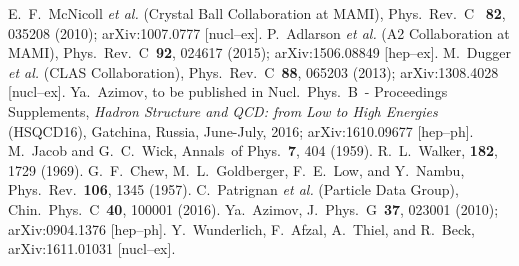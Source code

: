 \documentclass[prc,reprint,onecolumn,amsmath,amssymb,superscriptaddress]{revtex4-1}
\begin{document}
\begin{thebibliography}{99}
 E.~F.~McNicoll \textit{et al.} (Crystal Ball Collaboration
	at MAMI), Phys.\ Rev.\ C \ \textbf{82}, 035208 (2010);
	arXiv:1007.0777 [nucl--ex].
 P.~Adlarson \textit{et al.} (A2 Collaboration at MAMI),
	Phys.\ Rev.\ C\ \textbf{92}, 024617 (2015); 
	arXiv:1506.08849 [hep--ex].
 M.~Dugger \textit{et al.} (CLAS Collaboration), Phys.\
	Rev.\ C\ \textbf{88}, 065203 (2013); 
	arXiv:1308.4028 [nucl--ex].
 Ya.~Azimov, to be published in Nucl.\ Phys.\ B\ -
        Proceedings Supplements, \textit{Hadron Structure and QCD:
        from Low to High Energies} (HSQCD16), Gatchina, Russia,
        June-July, 2016; arXiv:1610.09677 [hep--ph].
 M.~Jacob and G.~C.~Wick, Annals\ of Phys.\ {\bf 7}, 404 (1959).
\bibitem{Walker} R.~L.~Walker, \textbf{182}, 1729 (1969).
 G.~F.~Chew, M.~L.~Goldberger, F.~E.~Low, and Y.~Nambu,
        Phys.\ Rev.\ \textbf{106}, 1345 (1957).
 C.~Patrignan \textit{et al.} (Particle Data Group), Chin.\
	Phys.\ C\ \textbf{40}, 100001 (2016).
\bibitem{YaA} Ya.~Azimov, J.\ Phys.\ G\ \textbf{37}, 023001 (2010);
        arXiv:0904.1376 [hep--ph].
\bibitem{Beck} Y.~Wunderlich, F.~Afzal, A.~Thiel, and R.~Beck,
       arXiv:1611.01031 [nucl--ex].
\end{thebibliography}
\end{document}
